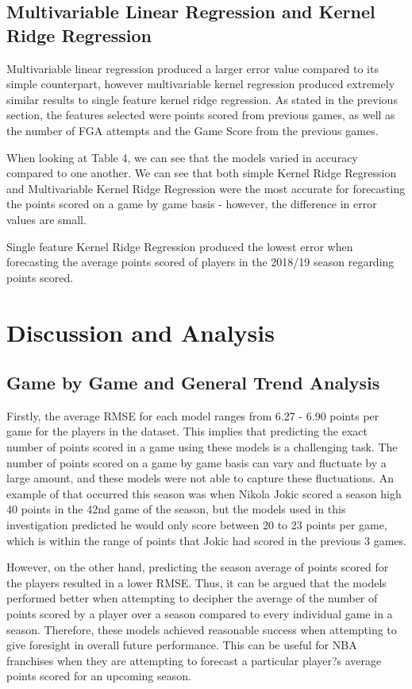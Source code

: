 \documentclass[a4paper,11pt,twoside]{article}
\begin{document}
\subsection{Multivariable Linear Regression and Kernel Ridge Regression}
Multivariable  linear regression produced a larger error value compared to its simple counterpart, however multivariable kernel regression produced extremely similar results to single feature kernel ridge regression. As stated in the previous section, the features selected were points scored from previous games, as well as the number of FGA attempts and the Game Score from the previous games.

When looking at Table 4, we can see that the models varied in accuracy compared to one another. We can see that both simple Kernel Ridge Regression and Multivariable Kernel Ridge Regression were the most accurate for forecasting the points scored on a game by game basis - however, the difference in error values are small.

Single feature Kernel Ridge Regression produced the lowest error when forecasting the average points scored of players in the 2018/19 season regarding points scored.

\newpage
\section{Discussion and Analysis}

\subsection{Game by Game and General Trend Analysis}
Firstly, the average RMSE for each model ranges from 6.27 - 6.90 points per game for the players in the dataset. This implies that predicting the exact number of points scored in a game using these models is a challenging task. The number of points scored on a game by game basis can vary and fluctuate by a large amount, and these models were not able to capture these fluctuations. An example of that occurred this season was when Nikola Jokic scored a season high 40 points in the 42nd game of the season, but the models used in this investigation predicted he would only score between 20 to 23 points per game, which is within the range of points that Jokic had scored in the previous 3 games. 

However, on the other hand, predicting the season average of points scored for the players resulted in a lower RMSE. Thus, it can be argued that the models performed better when attempting to decipher the average of the number of points scored by a player over a season compared to every individual game in a season. Therefore, these models achieved reasonable success when attempting to give foresight in overall future performance. This can be useful for NBA franchises when they are attempting to forecast a particular player?s average points scored for an upcoming season.
\end{document}
